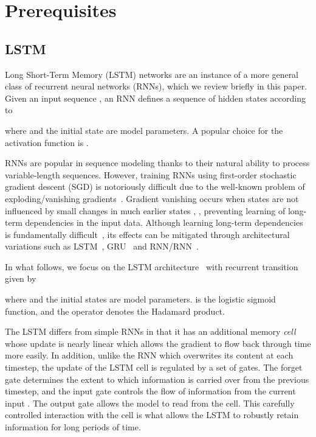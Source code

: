 \documentclass{article} \pdfoutput=1 \usepackage[utf8]{inputenc}
\begin{document}
\section{Prerequisites}
\label{sec:prerequisites}

\subsection{LSTM}

Long Short-Term Memory (LSTM) networks are an instance of a more general class of recurrent neural
networks (RNNs), which we review briefly in this paper.  Given an input sequence , an RNN defines a sequence of hidden states 
according to

where 
and the initial state  are model parameters.
A popular choice for the activation function  is .

RNNs are popular in sequence modeling thanks to their natural ability to process variable-length sequences.
However, training RNNs using first-order stochastic gradient descent (SGD) is notoriously difficult
due to the well-known problem of exploding/vanishing gradients~\citep{bengio1994learning,hochreiter1991untersuchungen,pascanudifficulty}.
Gradient vanishing occurs when states  are not influenced by small changes in much earlier states , ,
preventing learning of long-term dependencies in the input data.
Although learning long-term dependencies is fundamentally difficult~\citep{bengio1994learning},
its effects can be mitigated through architectural variations such as LSTM~\citep{lstm}, GRU~\citep{cho2014learning} and RNN/RNN~\citep{le2015simple,urnn}.

In what follows, we focus on the LSTM architecture~\citep{lstm} with recurrent transition given by

where 
and the initial states  are model parameters.
 is the logistic sigmoid function, and the  operator denotes the Hadamard product.

The LSTM differs from simple RNNs in that it has an additional memory \emph{cell} 
 whose update is nearly linear which allows the gradient to flow back 
through time more easily. In addition, unlike the RNN which overwrites its content 
at each timestep, the update of the LSTM cell is regulated by a set of gates.
The forget gate  determines the extent to which information is carried over from the previous timestep,
and the input gate  controls the flow of information from the current input .
The output gate  allows the model to read from the cell. This carefully 
controlled interaction with the cell is what allows the LSTM to robustly retain 
information for long periods of time.
\end{document}
